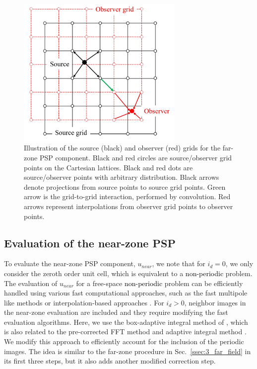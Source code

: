\documentclass{article}
\begin{document}
\begin{figure}[h] 
\includegraphics[width=8cm]{grid.png}
\centering
\caption{Illustration of the source (black) and observer (red) grids for the far-zone PSP component. Black and red circles are source/observer grid points on the Cartesian lattices. Black and red dots are source/observer points with arbitrary distribution. Black arrows denote projections from source points to source grid points. Green arrow is the grid-to-grid interaction, performed by convolution. Red arrows represent interpolations from observer grid points to observer points.} \label{fig:grid}
\end{figure}

\subsection{Evaluation of the near-zone PSP} \label{ssec:3_near_field}
To evaluate the near-zone PSP component, $u_{near}$, we note that for $i_d = 0$, we only consider the zeroth order unit cell, which is equivalent to a \textcolor{black}{non-periodic} problem. The evaluation of $u_{near}$ for a free-space \textcolor{black}{non-periodic} problem can be efficiently handled using various fast computational approaches, such as the fast multipole like methods \cite{GREENGARD1987325, 6230628} or interpolation-based approaches \cite{1159856, LI20108463, MENG20108430}. For $i_d > 0$, neighbor images in the near-zone evaluation are included and they require modifying the fast evaluation algorithms. Here, we use the box-adaptive integral method of \cite{NUFFT,6348120}, which is also related to the pre-corrected FFT method \cite{662670} and adaptive integral method \cite{ali_yilmaz, 7770011}. We modify this approach to efficiently account for the inclusion of the periodic images. The idea is similar to the far-zone procedure in Sec.~\ref{ssec:3_far_field} in its first three steps, but it also adds another modified correction step.
\end{document}
